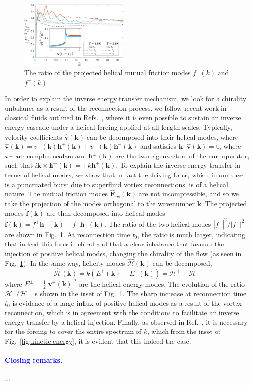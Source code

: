 \documentclass[%
 reprint,
 amsmath,amssymb,
 aps,
 prl,
]{revtex4-2}
\def \v{\mathbf{v}}
\def \k{\mathbf{k}}
\def \h{\mathbf{h}}
\def\blue#1{\textcolor{blue}{#1}}
\begin{document}
\begin{figure}[b]
    \centering
    \includegraphics*[width=0.48\textwidth]{fmfDecompFig.pdf}
    \caption{The ratio of the projected helical mutual friction modes $f^+(k)$ and $f^-(k)$}
    \label{fig:mutual-friction-decomp}
\end{figure}


In order to explain the inverse energy transfer mechanism, we look for a chirality unbalance as a result of the reconnection process.
we follow recent work in classical fluids outlined in Refs.~\cite{biferaleInverseEnergyCascade2012a,plunianInverseCascadeEnergy2020a}, where it is even possible to sustain an inverse energy cascade under a helical forcing applied at all length scales. Typically, velocity coefficients $\hat{\v}(\k)$ can be decomposed into their helical modes, where $\hat{\v}(\k)=v^+(\k)\h^+(\k) + v^-(\k)\h^-(\k)$ and satisfies $\k\cdot\hat{\v}(\k)=0$, where $\v^{\pm}$ are complex scalars and $\h^{\pm}(\k)$ are the two eigenvectors of the curl operator, such that $i\k\times\h^{\pm}(\k)=\pm k \h^{\pm}(\k)$. To explain the inverse energy transfer in terms of helical modes, we show that in fact the driving force, which in our case is a punctuated burst due to superfluid vortex reconnections, is of a helical nature. The mutual friction modes $\hat{\mathbf{F}}_{ns}(\k)$ are not incompressible, and so we take the projection of the modes orthogonal to the wavenumber $\k$. The projected modes $\hat{\mathbf{f}}(\k)$ are then decomposed into helical modes $\hat{\mathbf{f}}(\k)=f^+\h^{+}(\k) + f^-\h^{-}(\k)$. The ratio of the two helical modes $|f^+|^2/|f^-|^2$ are shown in Fig.~\ref{fig:mutual-friction-decomp}. At reconnection time $t_0$, the ratio is much larger, indicating that indeed this force is chiral and that a clear inbalance that favours the injection of positive helical modes, changing the chirality of the flow (as seen in Fig.~\ref{fig:mutual-friction-decomp}). In the same way, helicity modes $\hat{\mathcal{H}}(\k)$ can be decomposed,
\begin{equation}
    \hat{\mathcal{H}}(\k) = k(E^+(\k) - E^-(\k)) = \mathcal{H}^+ + \mathcal{H}^-
\end{equation}
where $E^{\pm}=\frac{1}{2}|\v^{\pm}(\k)|^2$ are the helical energy modes. The evolution of the ratio $\mathcal{H}^+/\mathcal{H}^-$ is shown in the inset of Fig.~\ref{fig:mutual-friction-decomp}. The sharp increase at reconnection time $t_0$ is evidence of a large influx of positive helical modes as a result of the vortex reconnection, which is in agreement with the conditions to facilitate an inverse energy transfer by a helical injection. Finally, as observed in Ref.~\cite{plunianInverseCascadeEnergy2020a}, it is necessary for the forcing to cover the entire spectrum of $k$, which from the inset of Fig.~\ref{fig:kinetic-energy}, it is evident that this indeed the case.           

\blue{
\paragraph*{Closing remarks.---}...
}

\end{document}

